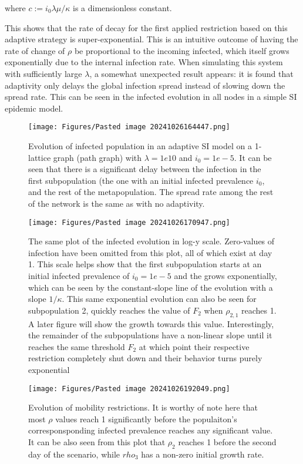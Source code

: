 where $c := i_{0} \lambda \mu / \kappa$ is a dimensionless constant.

This shows that the rate of decay for the first applied restriction based on this adaptive strategy is super-exponential. This is an intuitive outcome of having the rate of change of $\rho$ be proportional to the incoming infected, which itself grows exponentially due to the internal infection rate. When simulating this system with sufficiently large $\lambda$, a somewhat unexpected result appears: it is found that adaptivity only delays the global infection spread instead of slowing down the spread rate. This can be seen in the infected evolution in all nodes in a simple SI epidemic model.

\begin{figure}[!ht]
    \centering
    \texttt{[image: Figures/Pasted image 20241026164447.png]}
    \caption{\small Evolution of infected population in an adaptive SI model on a 1-lattice graph 
    (path graph) with $\lambda = 1e10$ and $i_0 = 1e-5$. It can be seen that there is a significant 
    delay between the infection in the first subpopulation (the one with an initial infected prevalence $i_0$, and the rest of the metapopulation. The spread rate among the rest of the network is the same as with no adaptivity.}
\end{figure}

\begin{figure}[!ht]
    \centering
    \texttt{[image: Figures/Pasted image 20241026170947.png]}
    \caption{\small The same plot of the infected evolution in log-y scale. 
    Zero-values of infection have been omitted from this plot, all of which exist at day 1. 
    This scale helps show that the first subpopulation starts at an initial infected prevalence of 
    $i_0=1e-5$ and the grows exponentially, which can be seen by the constant-slope line of the evolution with a slope $1/\kappa$. This same exponential evolution can also be seen for subpopulation 2, quickly reaches the value of $F_2$ when $\rho_{2,1}$ reaches 1. A later figure will show the growth towards this value. Interestingly, the remainder of the subpopulations have a non-linear slope until it reaches the same threshold $F_2$ at which point their respective restriction completely shut down and their behavior turns purely exponential}
\end{figure}

\begin{figure}[!ht]
    \centering
    \texttt{[image: Figures/Pasted image 20241026192049.png]}
    \caption{\small Evolution of mobility restrictions. It is worthy of note here that most $\rho$ values reach 1 significantly before the populaiton's corresponsponding infected prevalence reaches any significant value. It can be also seen from this plot that $\rho_2$ reaches 1 before the second day of the scenario, while $rho_3$ has a non-zero initial growth rate.}
\end{figure}

